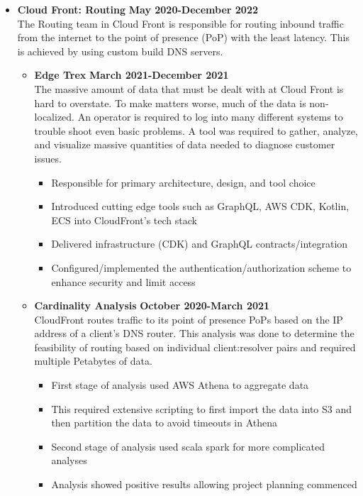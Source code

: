 \documentclass[overlapped]{res}
\begin{document}
\begin{resume}
\begin{itemize}[leftmargin=0in]
    \item[]
    \textbf{Cloud Front: Routing} \hfill \textbf{May 2020-December 2022} \\
    The Routing team in Cloud Front is responsible for routing inbound traffic from the internet to the
    point of presence (PoP) with the least latency. This is achieved by using custom build DNS servers.
    \begin{itemize}
        \item[]
        \textbf{Edge Trex} \hfill \textbf{March 2021-December 2021} \\
        The massive amount of data that must be dealt with at Cloud Front is hard to overstate. To make matters worse,
        much of the data is non-localized. An operator is required to log into many different systems to trouble shoot even basic problems.
        A tool was required to gather, analyze, and visualize massive quantities of data needed to diagnose customer issues.
        \begin{itemize}
            \item[\textbullet] Responsible for primary architecture, design, and tool choice
            \item[\textbullet] Introduced cutting edge tools such as GraphQL, AWS CDK, Kotlin, ECS into CloudFront's tech stack
            \item[\textbullet] Delivered infrastructure (CDK) and GraphQL contracts/integration
            \item[\textbullet] Configured/implemented the authentication/authorization scheme to enhance security and limit access
        \end{itemize}
        \vspace{0.125in}

        \item[]
        \textbf{Cardinality Analysis} \hfill \textbf{October 2020-March 2021} \\
        CloudFront routes traffic to its point of presence PoPs based on the IP address of a client's DNS router.
        This analysis was done to determine the feasibility of routing based on individual client:resolver pairs and required multiple Petabytes of data.
        \begin{itemize}
            \item[\textbullet] First stage of analysis used AWS Athena to aggregate data
            \item[\textbullet] This required extensive scripting to first import the data into S3 and then partition the data to avoid timeouts in Athena
            \item[\textbullet] Second stage of analysis used scala spark for more complicated analyses 
            \item[\textbullet] Analysis showed positive results allowing project planning commenced
        \end{itemize}
        \vspace{0.125in}


\end{itemize}
\end{itemize}
\end{resume}
\end{document}
